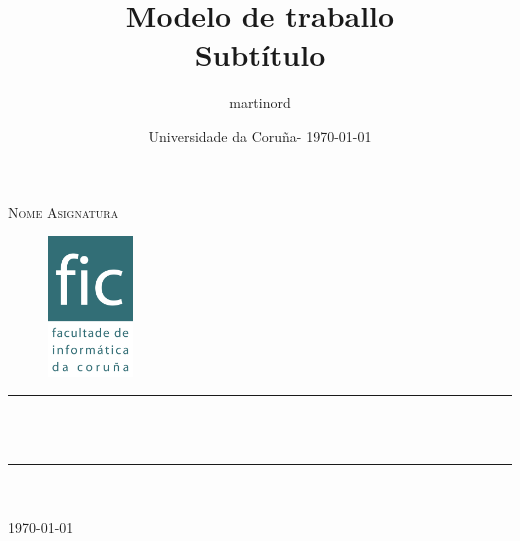 \documentclass[12pt]{article}
\begin{document}
\title{Modelo de traballo\\[0.5cm]
		\Large Subtítulo}

\author{martinord}

\date{Universidade da Coruña- \today}


\begin{titlepage}

\newcommand{\HRule}{\rule{\linewidth}{0.5mm}} %

\center %
 

\textsc{\Large Nome Asignatura}\\[1cm]

\begin{figure}[!h]
	\centering
	\includegraphics[width=0.2\textwidth]{logo.png}
\end{figure}


\HRule \\[0.4cm]
{ \huge \bfseries \@title}\\[0.4cm]
\HRule \\[1.5cm]
 

	\@author \\[3cm]


{\large \today}\\[2cm] 
 

\vfill %

\end{titlepage}

\tableofcontents
\clearpage



\clearpage


 
\end{document}

